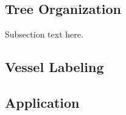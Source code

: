 \documentclass[journal]{IEEEtran}
\begin{document}
\subsection{Tree Organization}
Subsection text here.

\subsection{Vessel Labeling}

\subsection{Application}



%
%



%
%
\end{document}
